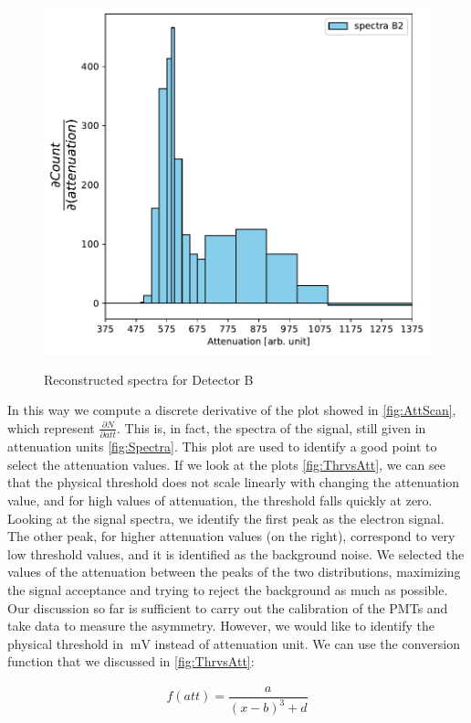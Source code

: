\begin{figure}[h]
{\includegraphics[scale = 0.5]{Analysis/CalibrationPMT/B2.pdf}}
\caption{Reconstructed spectra for Detector B}
\end{figure}

In this way we compute a discrete derivative of the plot showed in \ref{fig:AttScan}, which represent $\frac{\partial N}{\partial att}$. This is, in fact, the spectra of the signal, still given in attenuation units \ref{fig:Spectra}.
This plot are used to identify a good point to select the attenuation values. If we look at the plots \ref{fig:ThrvsAtt}, we can see that the physical threshold does not scale linearly with changing the attenuation value, and for high values of attenuation, the threshold falls quickly at zero. 
Looking at the signal spectra, we identify the first peak as the electron signal. The other peak, for higher attenuation values (on the right), correspond to very low threshold values, and it is identified as the background noise. 
We selected the values of the attenuation between the peaks of the two distributions, maximizing the signal acceptance and trying to reject the background as much as possible.
Our discussion so far is sufficient to carry out the calibration of the PMTs and take data to measure the asymmetry. However, we would like to identify the physical threshold in $\SI{}{\milli \volt}$ instead of attenuation unit. We can use the conversion function that we discussed in \ref{fig:ThrvsAtt}:

\begin{align*}
f(att) = \dfrac{a}{(x - b)^{3} + d}
\end{align*} 

